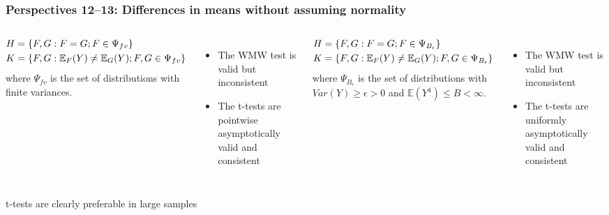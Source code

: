 \begin{frame}\frametitle{Perspectives 12--13: Differences in means without assuming normality}
	\begin{columns}
		\small
	\begin{per}
		\vspace{-1.5em}
		\begin{align*}\vspace{-1.5em}
H &=\{F,G:F=G; F \in \Psi_{fv}\}\\
K &=\{F,G:\mathbb{E}_F(Y)\neq\mathbb{E}_G(Y); F,G \in \Psi_{fv}\}
		\end{align*}
		where $\Psi_{fv}$ is the set of distributions with finite variances.
	\end{per}
	\begin{itemize}
		\item The WMW test is \alert{valid but inconsistent}
		\item The t-tests are \alert{pointwise asymptotically valid} and \alert{consistent}
	\end{itemize}
\begin{per}
	\vspace{-1.5em}
	\begin{align*}\vspace{-1.5em}
H &=\{F,G:F=G; F \in \Psi_{B_\epsilon}\}\\
K &=\{F,G:\mathbb{E}_F(Y)\neq\mathbb{E}_G(Y); F,G \in \Psi_{B_\epsilon}\}
	\end{align*}
	where $\Psi_{B_\epsilon}$ is the set of distributions with $Var(Y)\geq \epsilon >0$ and $\mathbb{E}(Y^4)\leq B<\infty$.
\end{per}
	\begin{itemize}
	\item The WMW test is \alert{valid but inconsistent}
	\item The t-tests are \alert{uniformly asymptotically valid} and \alert{consistent}
\end{itemize}
\end{columns}
\vspace{0.5em}
\thus t-tests are clearly preferable in large samples
\end{frame}



